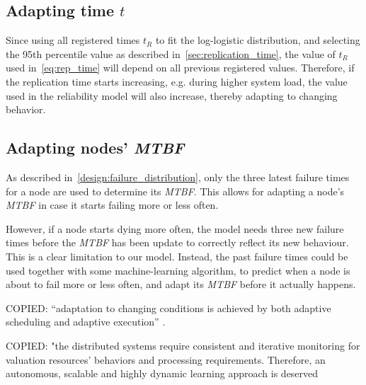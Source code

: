 \documentclass{cslthse-msc}
\begin{document}
\subsection{Adapting time $t$}
Since using all registered times $t_R$ to fit the log-logistic distribution, and selecting the 95th percentile value as described in~\cref{sec:replication_time}, the value of $t_R$ used in~\cref{eq:rep_time} will depend on all previous registered values. Therefore, if the replication time starts increasing, e.g. during higher system load, the value used in the reliability model will also increase, thereby adapting to changing behavior. 

\subsection{Adapting nodes' \emph{MTBF}} \label{sec:design_self_adapting_mtbf}
As described in~\cref{design:failure_distribution}, only the three latest failure times for a node are used to determine its \emph{MTBF}. This allows for adapting a node's \emph{MTBF} in case it starts failing more or less often. 

However, if a node starts dying more often, the model needs three new failure times before the \emph{MTBF} has been update to correctly reflect its new behaviour. This is a clear limitation to our model. Instead, the past failure times could be used together with some machine-learning algorithm, to predict when a node is about to fail more or less often, and adapt its \emph{MTBF} before it actually happens.

\iffalse
COPIED: “adaptation to changing conditions is achieved by both adaptive scheduling and adaptive execution” \cite{evalOfGridRel}.

COPIED:
"the distributed systems require consistent and iterative monitoring for valuation resources’ behaviors and processing requirements. Therefore, an autonomous, scalable and highly dynamic learning approach is deserved \cite{imprRelAdaptRL}

\end{document}
